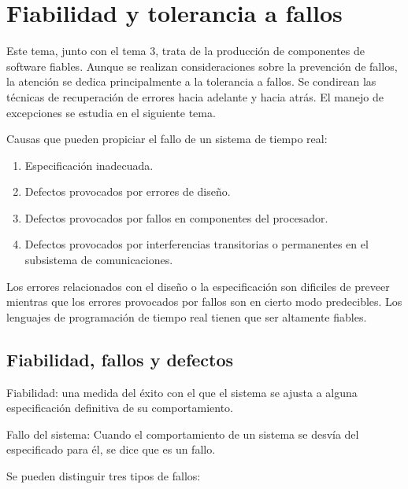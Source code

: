 \section{Fiabilidad y tolerancia a fallos}

Este tema, junto con el tema 3, trata de la producción de componentes de
software fiables. Aunque se realizan consideraciones sobre la prevención de
fallos, la atención se dedica principalmente a la tolerancia a fallos. Se
condirean las técnicas de recuperación de errores hacia adelante y hacia atrás.
El manejo de excepciones se estudia en el siguiente tema.

Causas que pueden propiciar el fallo de un sistema de tiempo real:
\begin{enumerate}
\item Especificación inadecuada.
\item Defectos provocados por errores de diseño.
\item Defectos provocados por fallos en componentes del procesador.
\item Defectos provocados por interferencias transitorias o permanentes en el
subsistema de comunicaciones.
\end{enumerate}

Los errores relacionados con el diseño o la especificación son dificiles de
preveer mientras que los errores provocados por fallos son en cierto modo
predecibles. Los lenguajes de programación de tiempo real tienen que ser
altamente fiables.

\subsection{Fiabilidad, fallos y defectos}

Fiabilidad: una medida del éxito con el que el sistema se ajusta a alguna
especificación definitiva de su comportamiento.

Fallo del sistema: Cuando el comportamiento de un sistema se desvía del
especificado para él, se dice que es un fallo.

Se pueden distinguir tres tipos de fallos:

